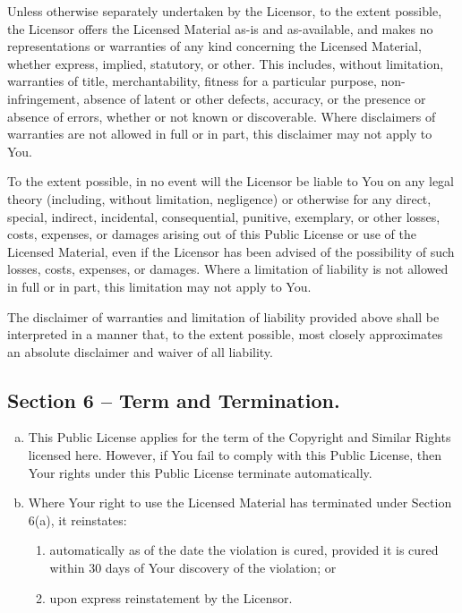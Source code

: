 {\begin{enumerate}[a.]
{\bfseries
\item Unless otherwise separately undertaken by the Licensor, to the extent possible, the Licensor offers the Licensed Material as-is and as-available, and makes no representations or warranties of any kind concerning the Licensed Material, whether express, implied, statutory, or other. This includes, without limitation, warranties of title, merchantability, fitness for a particular purpose, non-infringement, absence of latent or other defects, accuracy, or the presence or absence of errors, whether or not known or discoverable. Where disclaimers of warranties are not allowed in full or in part, this disclaimer may not apply to You.
\item To the extent possible, in no event will the Licensor be liable to You on any legal theory (including, without limitation, negligence) or otherwise for any direct, special, indirect, incidental, consequential, punitive, exemplary, or other losses, costs, expenses, or damages arising out of this Public License or use of the Licensed Material, even if the Licensor has been advised of the possibility of such losses, costs, expenses, or damages. Where a limitation of liability is not allowed in full or in part, this limitation may not apply to You.%
}
\item The disclaimer of warranties and limitation of liability provided above shall be interpreted in a manner that, to the extent possible, most closely approximates an absolute disclaimer and waiver of all liability.
\end{enumerate}

\subsection*{Section 6 -- Term and Termination.}

\begin{enumerate}[a.]
\item This Public License applies for the term of the Copyright and Similar Rights licensed here. However, if You fail to comply with this Public License, then Your rights under this Public License terminate automatically.

\item Where Your right to use the Licensed Material has terminated under Section 6(a), it reinstates:

\begin{enumerate}[1.]
\item automatically as of the date the violation is cured, provided it is cured within 30 days of Your discovery of the violation; or
\item upon express reinstatement by the Licensor.
\end{enumerate}


\end{enumerate}}
